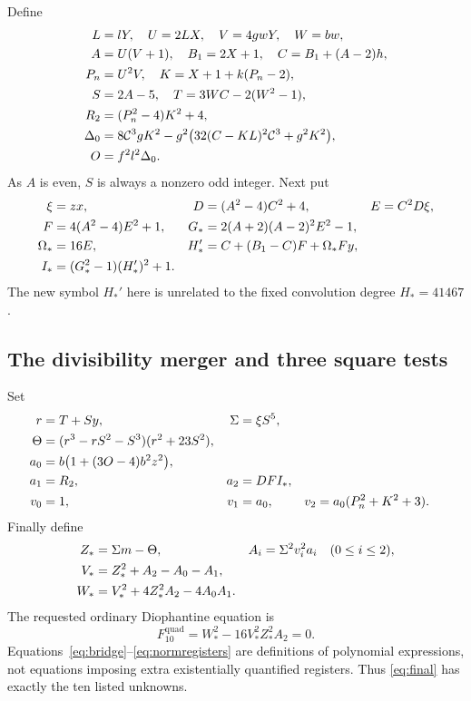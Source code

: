 \documentclass[11pt,letterpaper]{article}
\theoremstyle{definition}\newtheorem{definition}[theorem]{Definition}
\theoremstyle{remark}\newtheorem{remark}[theorem]{Remark}
\newcommand{\cC}{\mathcal C}
\begin{document}
Define
\begin{align}
 L&=lY,\quad U=2LX,\quad V=4gwY,\quad W=bw,\notag\\
 A&=U(V+1),\quad B_1=2X+1,\quad C=B_1+(A-2)h,\notag\\
 P_n&=U^2V,\quad K=X+1+k(P_n-2),\notag\\
 S&=2A-5,\quad T=3WC-2(W^2-1),\notag\\
 R_2&=(P_n^2-4)K^2+4,\notag\\
 \Delta_0&=8\cC^3gK^2-g^2\bigl(32(C-KL)^2\cC^3+g^2K^2\bigr),\notag\\
 O&=f^2l^2\Delta_0.\label{eq:bridge}
\end{align}
As $A$ is even, $S$ is always a nonzero odd integer. Next put
\begin{align}
 \xi&=zx,&D&=(A^2-4)C^2+4,&E&=C^2D\xi,\notag\\
 F&=4(A^2-4)E^2+1,&G_*&=2(A+2)(A-2)^2E^2-1,\notag\\
 \Omega_*&=16E,&H_*'&=C+(B_1-C)F+\Omega_*Fy,\notag\\
 I_*&=(G_*^2-1)(H_*')^2+1.\label{eq:lucas}
\end{align}
The new symbol $H_*'$ here is unrelated to the fixed convolution degree $H_*=41467$.

\subsection{The divisibility merger and three square tests}

Set
\begin{align}
 r&=T+Sy,&\Sigma&=\xi S^5,\notag\\
 \Theta&=(r^3-rS^2-S^3)(r^2+23S^2),\notag\\
 a_0&=b\bigl(1+(3O-4)b^2z^2\bigr),\notag\\
 a_1&=R_2,&a_2&=DFI_*,\notag\\
 v_0&=1,&v_1&=a_0,&v_2&=a_0(P_n^2+K^2+3).\label{eq:merger}
\end{align}
Finally define
\begin{align}
 Z_*&=\Sigma m-\Theta,&A_i&=\Sigma^2v_i^2a_i\quad(0\le i\le2),\notag\\
 V_*&=Z_*^2+A_2-A_0-A_1,\notag\\
 W_*&=V_*^2+4Z_*^2A_2-4A_0A_1.\label{eq:normregisters}
\end{align}
The requested ordinary Diophantine equation is
\begin{equation}\label{eq:final}
 \boxed{\quad F_{10}^{\mathrm{quad}}=W_*^2-16V_*^2Z_*^2A_2=0.\quad}
\end{equation}
Equations~\eqref{eq:bridge}--\eqref{eq:normregisters} are definitions of polynomial expressions, not equations imposing extra existentially quantified registers. Thus \eqref{eq:final} has exactly the ten listed unknowns.
\end{document}
